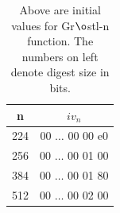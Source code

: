   \begin{table}
    \begin{center}
      \begin{tabular}{ *{2}{c} } \hline
        n   & $iv_{n}$         \\ \hline
        224 & 00 $\dots$ 00 00 e0 \\
        256 & 00 $\dots$ 00 01 00 \\
        384 & 00 $\dots$ 00 01 80 \\
        512 & 00 $\dots$ 00 02 00 \\ \hline
      \end{tabular}
    \caption{Above are initial values for Gr$\o$stl-n function. The numbers on left denote digest size in bits.}
    \end{center}
  \end{table}


